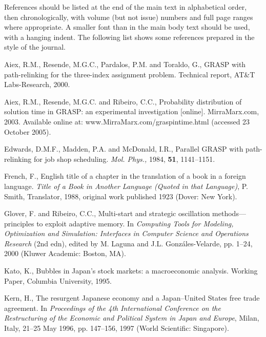 \documentclass{rQUF2e}
\theoremstyle{plain}
\theoremstyle{definition}
\theoremstyle{remark}
\begin{document}
References should be listed at the end of the main text in alphabetical order, then chronologically, with volume (but not issue)
numbers and full page ranges where appropriate. A smaller font than in the main body text should be used,
with a hanging indent. The following list shows some references prepared in the style of the journal.

\begin{thebibliography}{99}

Aiex, R.M., Resende,  M.G.C., Pardalos, P.M. and Toraldo, G.,
 GRASP with path-relinking for the three-index assignment problem.
 Technical report, AT\&T Labs-Research, 2000.

Aiex, R.M., Resende,  M.G.C. and Ribeiro, C.C., Probability distribution of
 solution time in GRASP: an experimental investigation [online].
 MirraMarx.com, 2003. Available online at: www.MirraMarx.com/graspintime.html
 (accessed 23 October 2005).

Edwards, D.M.F., Madden,  P.A. and McDonald, I.R., Parallel GRASP with
 path-relinking for job shop scheduling. {\itshape Mol. Phys.,} 1984,
 {\bfseries 51}, 1141--1151.

French, F., English title of a chapter in the translation of a book in a
 foreign language.  {\itshape Title of a Book in Another Language (Quoted
 in that Language)}, P. Smith, Translator, 1988, original work published 1923
 (Dover: New York).

Glover, F. and Ribeiro, C.C., Multi-start and strategic oscillation
 methods---principles to exploit adaptive
 memory. In {\it Computing Tools for Modeling, Optimization and Simulation:
 Interfaces in Computer Science and
 Operations Research} (2nd edn), edited by M. Laguna and J.L. Gonz\'{a}les-Velarde,
 pp. 1--24, 2000 (Kluwer Academic: Boston, MA).

Kato, K., Bubbles in Japan's stock markets: a macroeconomic analysis. Working
 Paper, Columbia University, 1995.

Kern, H., The resurgent Japanese economy and a Japan--United States free
 trade agreement. In {\em{Proceedings of
 the 4th International Conference on the Restructuring of the Economic and
 Political System in Japan and
 Europe}}, Milan, Italy, 21--25 May 1996, pp. 147--156, 1997 (World Scientific: Singapore).


\end{thebibliography}
\end{document}
